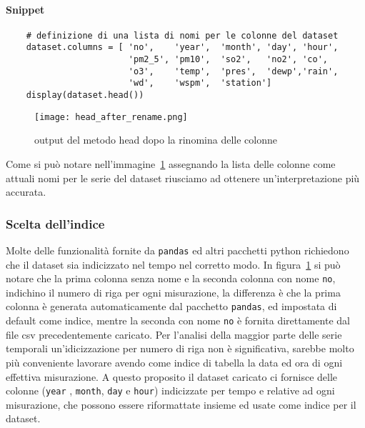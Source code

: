 \paragraph{Snippet}
\begin{verbatim}
    # definizione di una lista di nomi per le colonne del dataset
    dataset.columns = [ 'no',    'year',  'month', 'day', 'hour', 
                        'pm2_5', 'pm10',  'so2',   'no2', 'co',  
                        'o3',    'temp',  'pres',  'dewp','rain',  
                        'wd',    'wspm',  'station']
    display(dataset.head())
\end{verbatim}
\begin{figure}[h!]
    \texttt{[image: head\_after\_rename.png]}
    \caption{output del metodo head dopo la rinomina delle colonne}
    \label{fig:head_after_rename}
\end{figure}
Come si può notare nell'immagine~\ref*{fig:head_after_rename}
assegnando la lista delle colonne come attuali nomi per le serie del dataset
riusciamo ad ottenere un'interpretazione più accurata.


\subsubsection{Scelta dell'indice}
Molte delle funzionalità fornite da \texttt{pandas} ed altri pacchetti python
richiedono che il dataset sia indicizzato nel tempo nel corretto modo.
In figura~\ref*{fig:head_after_rename} si può notare che la prima colonna
senza nome e la seconda colonna con nome \texttt{no}, indichino
il numero di riga per ogni misurazione, la differenza è che la prima colonna
è generata automaticamente dal pacchetto \texttt{pandas}, ed impostata
di default come indice, mentre la seconda con
nome \texttt{no} è fornita direttamente dal file csv precedentemente caricato.
Per l'analisi della maggior parte delle serie temporali un'idicizzazione per numero
di riga non è significativa, sarebbe molto più conveniente lavorare avendo
come indice di tabella la data ed ora di ogni effettiva misurazione.
A questo proposito il dataset caricato ci fornisce delle colonne (\texttt{year}
, \texttt{month}, \texttt{day} e \texttt{hour}) indicizzate per tempo e relative
ad ogni misurazione, che possono essere riformattate insieme ed usate come indice
per il dataset.\\
\\
